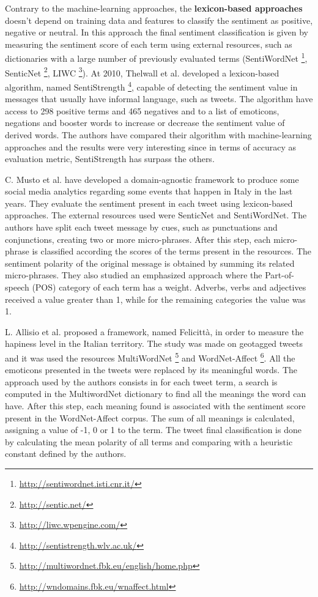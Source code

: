 Contrary to the machine-learning approaches, the \textbf{lexicon-based approaches} doesn't depend on training data and features to classify the sentiment as positive, negative or neutral. In this approach the final sentiment classification is given by measuring the sentiment score of each term using external resources, such as dictionaries with a large number of previously evaluated terms (SentiWordNet \footnote{\url{http://sentiwordnet.isti.cnr.it/}}, SenticNet \footnote{\url{http://sentic.net/}}, LIWC \footnote{\url{http://liwc.wpengine.com/}}). At 2010, Thelwall et al. \cite{kn:Thelwall:2010} developed a lexicon-based algorithm, named SentiStrength \footnote{\url{http://sentistrength.wlv.ac.uk/}}, capable of detecting the sentiment value in messages that usually have informal language, such as tweets. The algorithm have access to 298 positive terms and 465 negatives and to a list of emoticons, negations and booster words to increase or decrease the sentiment value of derived words. The authors have compared their algorithm with machine-learning approaches and the results were very interesting since in terms of accuracy as evaluation metric, SentiStrength has surpass the others.

C. Musto et al. \cite{kn:Musto2015} have developed a domain-agnostic framework to produce some social media analytics regarding some events that happen in Italy in the last years. They evaluate the sentiment present in each tweet using lexicon-based approaches. The external resources used were SenticNet and SentiWordNet. The authors have split each tweet message by cues, such as punctuations and conjunctions, creating two or more micro-phrases. After this step, each micro-phrase is classified according the scores of the terms present in the resources. The sentiment polarity of the original message is obtained by summing its related micro-phrases. They also studied an emphasized approach where the Part-of-speech (POS) category of each term has a weight. Adverbs, verbs and adjectives received a value greater than 1, while for the remaining categories the value was 1.

L. Allisio et al. \cite{kn:Allisio2013} proposed a framework, named Felicittà, in order to measure the hapiness level in the Italian territory. The study was made on geotagged tweets and it was used the resources MultiWordNet \footnote{\url{http://multiwordnet.fbk.eu/english/home.php}} and WordNet-Affect \footnote{\url{http://wndomains.fbk.eu/wnaffect.html}}. All the emoticons presented in the tweets were replaced by its meaningful words. The approach used by the authors consists in for each tweet term, a search is computed in the MultiwordNet dictionary to find all the meanings the word can have. After this step, each meaning found is associated with the sentiment score present in the WordNet-Affect corpus. The sum of all meanings is calculated, assigning a value of -1, 0 or 1 to the term. The tweet final classification is done by calculating the mean polarity of all terms and comparing with a heuristic constant defined by the authors.

